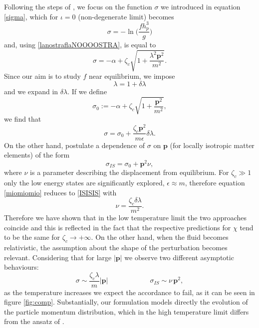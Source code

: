 \documentclass[useAMS,usenatbib,prd,twocolumn,nofootinbib]{revtex4-1}
\newcommand{\vect}[1]{\mathbf{{#1}}}
\newcommand{\spc}{\quad \quad \quad}
\begin{document}
Following the steps of \cite{Israel_Stewart_1979}, we focus on the function $\sigma$ we introduced in equation \eqref{sigma}, which for $\iota=0$ (non-degenerate limit) becomes
\begin{equation}
\sigma= -\ln \bigg( \dfrac{f h_p^3}{g} \bigg)
\end{equation}
and, using \eqref{lanostraflaNOOOOSTRA}, is equal to
\begin{equation}
\sigma = -\alpha + \zeta_c \sqrt{1+ \dfrac{\lambda^2 \vect{p}^2}{m^2}}.
\end{equation}
Since our aim is to study $f$ near equilibrium, we impose
\begin{equation}
\lambda = 1+\delta \lambda
\end{equation}
and we expand in $\delta \lambda$. If we define
\begin{equation}
\sigma_0 :=  -\alpha + \zeta_c \sqrt{1+ \dfrac{\vect{p}^2}{m^2}},
\end{equation}
we find that
\begin{equation}\label{miomiomio}
\sigma = \sigma_0 + \dfrac{\zeta_c \vect{p}^2}{m \epsilon} \delta \lambda.
\end{equation}
On the other hand, \cite{Israel_Stewart_1979} postulate a dependence of $\sigma$ on $\vect{p}$ (for locally isotropic matter elements) of the form
\begin{equation}\label{ISISIS}
\sigma_{IS} = \sigma_0 + \vect{p}^2 \nu,
\end{equation}
where $\nu$ is a parameter describing the displacement from equilibrium. For $\zeta_c \gg 1$ only the low energy states are significantly explored, $\epsilon \approx m$, therefore equation \eqref{miomiomio} reduces to \eqref{ISISIS} with
\begin{equation}
\nu= \dfrac{\zeta_c \delta \lambda}{m^2}.
\end{equation}
Therefore we have shown that in the low temperature limit the two approaches coincide and this is reflected in the fact that the respective predictions for $\chi$ tend to be the same for $\zeta_c \longrightarrow + \infty$. On the other hand, when the fluid becomes relativistic, the assumption about the shape of the perturbation becomes relevant. Considering that for large $|\vect{p}|$ we observe two different asymptotic behaviours:
\begin{equation}
\sigma \sim \dfrac{\zeta_c \lambda}{m} |\vect{p}|  \spc \spc  \sigma_{IS} \sim \nu \, \vect{p}^2,
\end{equation}
as the temperature increases we expect the accordance to fail, as it can be seen in figure \ref{fig:comp}. Substantially, our formulation models directly the evolution of the particle momentum distribution, which in the high temperature limit differs from the ansatz of \cite{Israel_Stewart_1979}.
\end{document}
